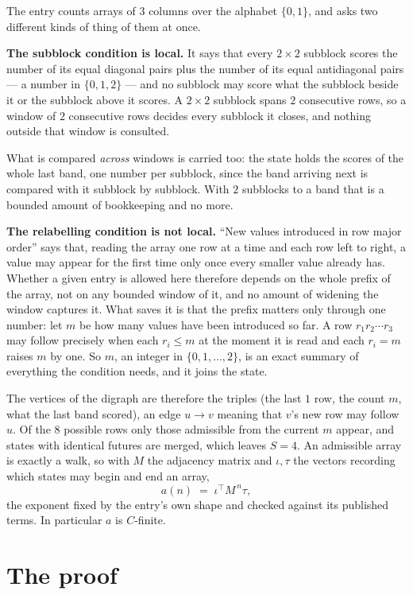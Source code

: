 \documentclass[11pt,a4paper]{article}
\theoremstyle{plain}
\theoremstyle{definition}
\begin{document}
The entry counts arrays of 3 columns over the alphabet $\{0,1\}$, and asks two different kinds of thing of them at once.

\textbf{The subblock condition is local.} It says that every $2\times2$ subblock scores the number of its equal diagonal pairs plus the number of its equal antidiagonal pairs --- a number in $\{0,1,2\}$ --- and no subblock may score what the subblock beside it or the subblock above it scores. A $ 2\times2$ subblock spans $2$ consecutive rows, so a window of $2$ consecutive rows decides every subblock it closes, and nothing outside that window is consulted.

What is compared \emph{across} windows is carried too: the state holds the scores of the whole last band, one number per subblock, since the band arriving next is compared with it subblock by subblock. With $2$ subblocks to a band that is a bounded amount of bookkeeping and no more.

\textbf{The relabelling condition is not local.} ``New values introduced in row major order'' says that, reading the array one row at a time and each row left to right, a value may appear for the first time only once every smaller value already has. Whether a given entry is allowed here therefore depends on the whole prefix of the array, not on any bounded window of it, and no amount of widening the window captures it. What saves it is that the prefix matters only through one number: let $m$ be how many values have been introduced so far. A row $r_1r_2\cdots r_3$ may follow precisely when each $r_i\le m$ at the moment it is read and each $r_i=m$ raises $m$ by one. So $m$, an integer in $\{0,1,\dots,2\}$, is an exact summary of everything the condition needs, and it joins the state.

The vertices of the digraph are therefore the triples (the last $1$ row, the count $m$, what the last band scored), an edge $u\to v$ meaning that $v$'s new row may follow $u$. Of the $8$ possible rows only those admissible from the current $m$ appear, and states with identical futures are merged, which leaves $S=4$. An admissible array is exactly a walk, so with $M$ the adjacency matrix and $\iota,\tau$ the vectors recording which states may begin and end an array,
\[
a(n)\;=\;\iota^{\!\top}M^{\,n}\tau ,
\]
the exponent fixed by the entry's own shape and checked against its published terms. In
particular $a$ is $C$-finite.

\section{The proof}
\end{document}
